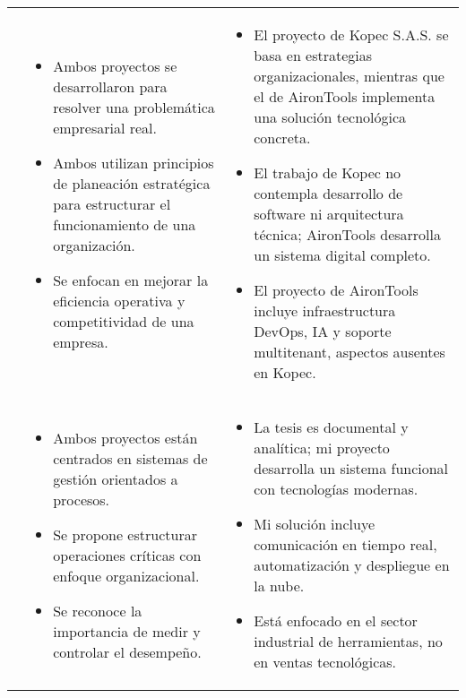 \begin{longtable}{m{.05\paperwidth} *{2}{m{.33\paperwidth}} @{}}
	\cite{Patino19} &
    \begin{itemize}[topsep=0pt,itemsep=0pt,parsep=0pt,partopsep=0pt,leftmargin=*]
        \item Ambos proyectos se desarrollaron para resolver una problemática empresarial real.
        \item Ambos utilizan principios de planeación estratégica para estructurar el funcionamiento de una organización.
        \item Se enfocan en mejorar la eficiencia operativa y competitividad de una empresa.
    \end{itemize} &
    \begin{itemize}[topsep=0pt,itemsep=0pt,parsep=0pt,partopsep=0pt,leftmargin=*]
        \item El proyecto de Kopec S.A.S. se basa en estrategias organizacionales, mientras que el de AironTools implementa una solución tecnológica concreta.
        \item El trabajo de Kopec no contempla desarrollo de software ni arquitectura técnica; AironTools desarrolla un sistema digital completo.
        \item El proyecto de AironTools incluye infraestructura DevOps, IA y soporte multitenant, aspectos ausentes en Kopec.
    \end{itemize} \\


	\cite{Jacome2016} &
	\begin{itemize}
		\item Ambos proyectos están centrados en sistemas de gestión orientados a procesos.
		\item Se propone estructurar operaciones críticas con enfoque organizacional.
		\item Se reconoce la importancia de medir y controlar el desempeño.
	\end{itemize} &
	\begin{itemize}
		\item La tesis es documental y analítica; mi proyecto desarrolla un sistema funcional con tecnologías modernas.
		\item Mi solución incluye comunicación en tiempo real, automatización y despliegue en la nube.
		\item Está enfocado en el sector industrial de herramientas, no en ventas tecnológicas.
	\end{itemize} \\
	\midrule


\end{longtable}
